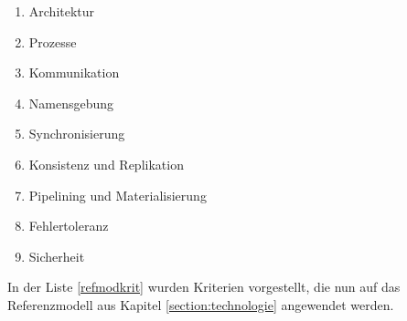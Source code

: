 \begin{enumerate}\label{refmodkrit}
	\item Architektur
	\item Prozesse
	\item Kommunikation
	\item Namensgebung
	\item Synchronisierung
	\item Konsistenz und Replikation
	\item Pipelining und Materialisierung
	\item Fehlertoleranz
	\item Sicherheit	
\end{enumerate}

In der Liste \ref{refmodkrit} wurden Kriterien vorgestellt, die nun auf das Referenzmodell aus Kapitel \ref{section:technologie} angewendet werden.
